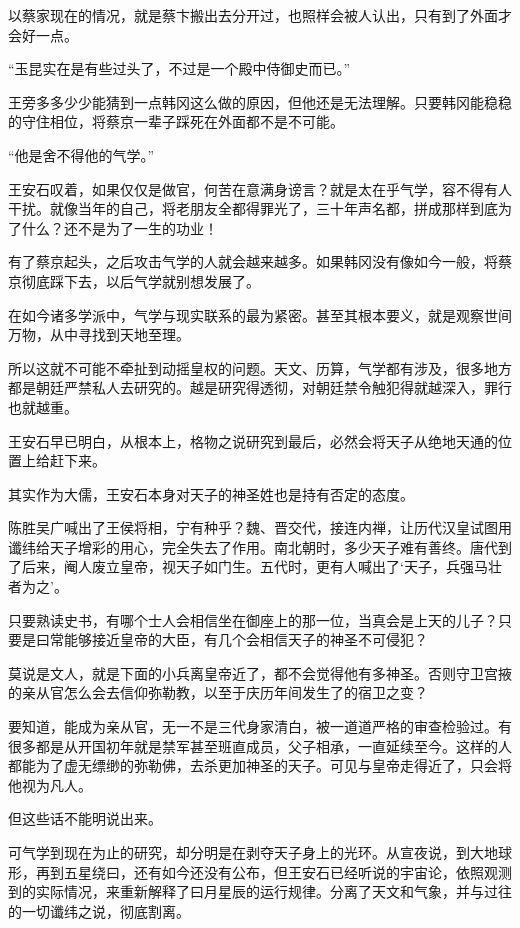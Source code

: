 以蔡家现在的情况，就是蔡卞搬出去分开过，也照样会被人认出，只有到了外面才会好一点。

“玉昆实在是有些过头了，不过是一个殿中侍御史而已。”

王旁多多少少能猜到一点韩冈这么做的原因，但他还是无法理解。只要韩冈能稳稳的守住相位，将蔡京一辈子踩死在外面都不是不可能。

“他是舍不得他的气学。”

王安石叹着，如果仅仅是做官，何苦在意满身谤言？就是太在乎气学，容不得有人干扰。就像当年的自己，将老朋友全都得罪光了，三十年声名都，拼成那样到底为了什么？还不是为了一生的功业！

有了蔡京起头，之后攻击气学的人就会越来越多。如果韩冈没有像如今一般，将蔡京彻底踩下去，以后气学就别想发展了。

在如今诸多学派中，气学与现实联系的最为紧密。甚至其根本要义，就是观察世间万物，从中寻找到天地至理。

所以这就不可能不牵扯到动摇皇权的问题。天文、历算，气学都有涉及，很多地方都是朝廷严禁私人去研究的。越是研究得透彻，对朝廷禁令触犯得就越深入，罪行也就越重。

王安石早已明白，从根本上，格物之说研究到最后，必然会将天子从绝地天通的位置上给赶下来。

其实作为大儒，王安石本身对天子的神圣姓也是持有否定的态度。

陈胜吴广喊出了王侯将相，宁有种乎？魏、晋交代，接连内禅，让历代汉皇试图用谶纬给天子增彩的用心，完全失去了作用。南北朝时，多少天子难有善终。唐代到了后来，阉人废立皇帝，视天子如门生。五代时，更有人喊出了‘天子，兵强马壮者为之’。

只要熟读史书，有哪个士人会相信坐在御座上的那一位，当真会是上天的儿子？只要是曰常能够接近皇帝的大臣，有几个会相信天子的神圣不可侵犯？

莫说是文人，就是下面的小兵离皇帝近了，都不会觉得他有多神圣。否则守卫宫掖的亲从官怎么会去信仰弥勒教，以至于庆历年间发生了的宿卫之变？

要知道，能成为亲从官，无一不是三代身家清白，被一道道严格的审查检验过。有很多都是从开国初年就是禁军甚至班直成员，父子相承，一直延续至今。这样的人都能为了虚无缥缈的弥勒佛，去杀更加神圣的天子。可见与皇帝走得近了，只会将他视为凡人。

但这些话不能明说出来。

可气学到现在为止的研究，却分明是在剥夺天子身上的光环。从宣夜说，到大地球形，再到五星绕曰，还有如今还没有公布，但王安石已经听说的宇宙论，依照观测到的实际情况，来重新解释了曰月星辰的运行规律。分离了天文和气象，并与过往的一切谶纬之说，彻底割离。

